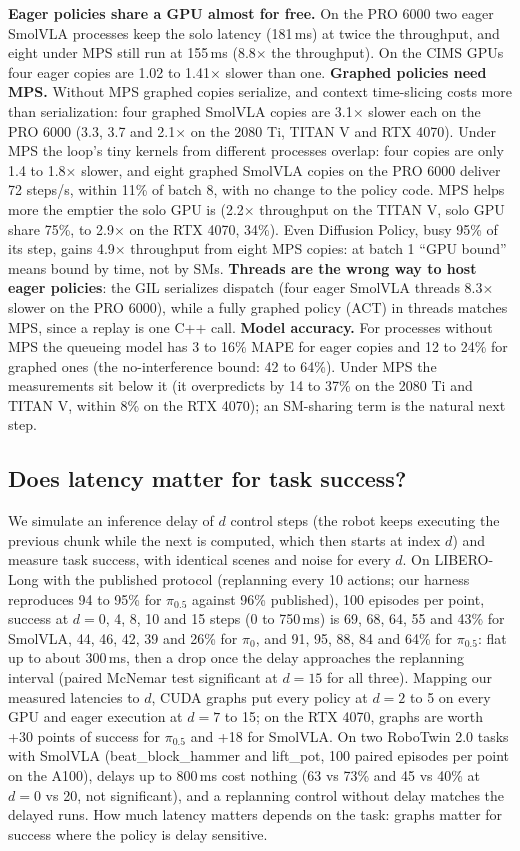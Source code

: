 \documentclass[10pt,twocolumn]{article}
\begin{document}
\textbf{Eager policies share a GPU almost for free.} On the PRO 6000 two eager SmolVLA processes
keep the solo latency (181\,ms) at twice the throughput, and eight under MPS still run at
155\,ms (8.8$\times$ the throughput). On the CIMS GPUs four eager copies are 1.02 to
1.41$\times$ slower than one.
\textbf{Graphed policies need MPS.} Without MPS graphed copies serialize, and context
time-slicing costs more than serialization: four graphed SmolVLA copies are 3.1$\times$ slower
each on the PRO 6000 (3.3, 3.7 and 2.1$\times$ on the 2080 Ti, TITAN V and RTX 4070). Under MPS
the loop's tiny kernels from different processes overlap: four copies are only 1.4 to
1.8$\times$ slower, and eight graphed SmolVLA copies on the PRO 6000 deliver 72 steps/s, within
11\% of batch 8, with no change to the policy code. MPS helps more the emptier the solo GPU is
(2.2$\times$ throughput on the TITAN V, solo GPU share 75\%, to 2.9$\times$ on the RTX 4070,
34\%). Even Diffusion Policy, busy 95\% of its step, gains 4.9$\times$ throughput from eight MPS
copies: at batch 1 ``GPU bound'' means bound by time, not by SMs.
\textbf{Threads are the wrong way to host eager policies}: the GIL serializes dispatch (four
eager SmolVLA threads 8.3$\times$ slower on the PRO 6000), while a fully graphed policy (ACT) in
threads matches MPS, since a replay is one C++ call.
\textbf{Model accuracy.} For processes without MPS the queueing model has 3 to 16\% MAPE for
eager copies and 12 to 24\% for graphed ones (the no-interference bound: 42 to 64\%). Under MPS
the measurements sit below it (it overpredicts by 14 to 37\% on the 2080 Ti and TITAN V, within
8\% on the RTX 4070); an SM-sharing term is the natural next step.

\subsection{Does latency matter for task success?}\label{sec:success}
We simulate an inference delay of $d$ control steps (the robot keeps executing the previous
chunk while the next is computed, which then starts at index $d$) and measure task success,
with identical scenes and noise for every $d$. On LIBERO-Long with the published protocol
(replanning every 10 actions; our harness reproduces 94 to 95\% for $\pi_{0.5}$ against 96\%
published), 100 episodes per point, success at $d = 0$, 4, 8, 10 and 15 steps (0 to 750\,ms) is
69, 68, 64, 55 and 43\% for SmolVLA, 44, 46, 42, 39 and 26\% for $\pi_0$, and 91, 95, 88, 84
and 64\% for $\pi_{0.5}$: flat up to about 300\,ms, then a drop once the delay approaches the
replanning interval (paired McNemar test significant at $d = 15$ for all three). Mapping our
measured latencies to $d$, CUDA graphs put every policy at $d = 2$ to 5 on every GPU and eager
execution at $d = 7$ to 15; on the RTX 4070, graphs are worth +30 points of success for
$\pi_{0.5}$ and +18 for SmolVLA. On two RoboTwin 2.0 tasks with SmolVLA (beat\_block\_hammer
and lift\_pot, 100 paired episodes per point on the A100), delays up to 800\,ms cost nothing
(63 vs 73\% and 45 vs 40\% at $d = 0$ vs 20, not significant), and a replanning control without
delay matches the delayed runs. How much latency matters depends on the task: graphs matter for
success where the policy is delay sensitive.
\end{document}
